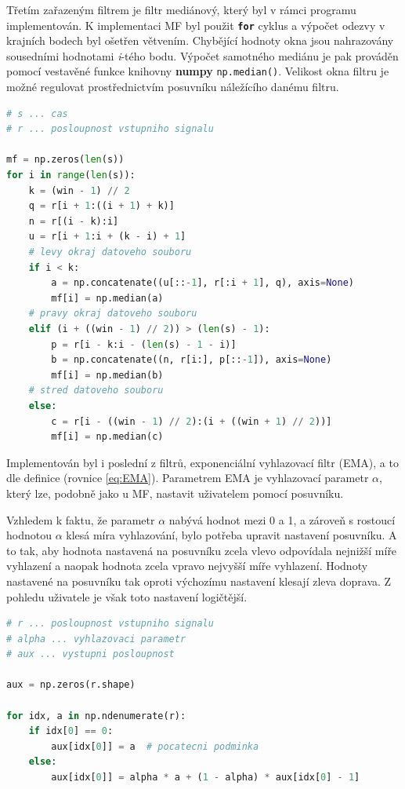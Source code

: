 \documentclass[a4paper, 12pt]{article}
\begin{document}
Třetím zařazeným filtrem je filtr mediánový, který byl v rámci programu implementován. K implementaci MF byl použit \textbf{\texttt{\textcolor{royalblue(traditional)}{for}}} cyklus a výpočet odezvy v krajních bodech byl ošetřen větvením. Chybějící hodnoty okna jsou nahrazovány sousedními hodnotami \textit{i}-tého bodu. Výpočet samotného mediánu je pak prováděn pomocí vestavěné funkce knihovny \textbf{numpy} \texttt{np.median()}. Velikost okna filtru je možné regulovat prostřednictvím posuvníku náležícího danému filtru. 
\vskip 0.2in
\begin{lstlisting}[language=Python,numbers=none,frame=single]
# s ... cas
# r ... posloupnost vstupniho signalu

mf = np.zeros(len(s))
for i in range(len(s)):
    k = (win - 1) // 2
    q = r[i + 1:((i + 1) + k)]
    n = r[(i - k):i]
    u = r[i + 1:i + (k - i) + 1]
    # levy okraj datoveho souboru
    if i < k:
        a = np.concatenate((u[::-1], r[:i + 1], q), axis=None)
        mf[i] = np.median(a)
    # pravy okraj datoveho souboru
    elif (i + ((win - 1) // 2)) > (len(s) - 1):
        p = r[i - k:i - (len(s) - 1 - i)]
        b = np.concatenate((n, r[i:], p[::-1]), axis=None)
        mf[i] = np.median(b)
    # stred datoveho souboru
    else:
        c = r[i - ((win - 1) // 2):(i + ((win + 1) // 2))]
        mf[i] = np.median(c)
\end{lstlisting}
\vskip 0.2in
Implementován byl i poslední z filtrů, exponenciální vyhlazovací filtr (EMA), a to dle definice (rovnice \ref{eq:EMA}). Parametrem EMA je vyhlazovací parametr $\alpha$, který lze, podobně jako u MF, nastavit uživatelem pomocí posuvníku. \par
Vzhledem k faktu, že parametr $\alpha$ nabývá hodnot mezi 0 a 1, a zároveň s rostoucí hodnotou $\alpha$ klesá míra vyhlazování, bylo potřeba upravit nastavení posuvníku. A to tak, aby hodnota nastavená na posuvníku zcela vlevo odpovídala nejnižší míře vyhlazení a naopak hodnota zcela vpravo nejvyšší míře vyhlazení. Hodnoty nastavené na posuvníku tak oproti výchozímu nastavení klesají zleva doprava. Z pohledu uživatele je však toto nastavení logičtější.

\vskip 0.2in
\begin{lstlisting}[language=Python,numbers=none,frame=single]
# r ... posloupnost vstupniho signalu
# alpha ... vyhlazovaci parametr
# aux ... vystupni posloupnost

aux = np.zeros(r.shape)

for idx, a in np.ndenumerate(r):
    if idx[0] == 0:
        aux[idx[0]] = a  # pocatecni podminka
    else:
        aux[idx[0]] = alpha * a + (1 - alpha) * aux[idx[0] - 1]
\end{lstlisting}
\vskip 0.2in
\end{document}
